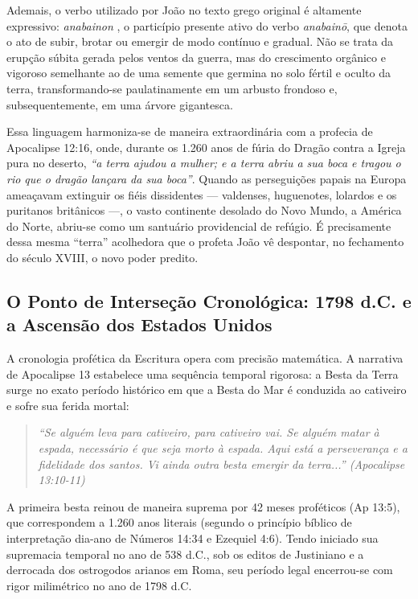 Ademais, o verbo utilizado por João no texto grego original é altamente expressivo: \textit{anabainon} , o particípio presente ativo do verbo \textit{anabainō}, que denota o ato de subir, brotar ou emergir de modo contínuo e gradual. Não se trata da erupção súbita gerada pelos ventos da guerra, mas do crescimento orgânico e vigoroso semelhante ao de uma semente que germina no solo fértil e oculto da terra, transformando-se paulatinamente em um arbusto frondoso e, subsequentemente, em uma árvore gigantesca.

Essa linguagem harmoniza-se de maneira extraordinária com a profecia de Apocalipse 12:16, onde, durante os 1.260 anos de fúria do Dragão contra a Igreja pura no deserto, \textit{``a terra ajudou a mulher; e a terra abriu a sua boca e tragou o rio que o dragão lançara da sua boca''}. Quando as perseguições papais na Europa ameaçavam extinguir os fiéis dissidentes — valdenses, huguenotes, lolardos e os puritanos britânicos —, o vasto continente desolado do Novo Mundo, a América do Norte, abriu-se como um santuário providencial de refúgio. É precisamente dessa mesma ``terra'' acolhedora que o profeta João vê despontar, no fechamento do século XVIII, o novo poder predito.



\subsection{O Ponto de Interseção Cronológica: 1798 d.C. e a Ascensão dos Estados Unidos}


A cronologia profética da Escritura opera com precisão matemática. A narrativa de Apocalipse 13 estabelece uma sequência temporal rigorosa: a Besta da Terra surge no exato período histórico em que a Besta do Mar é conduzida ao cativeiro e sofre sua ferida mortal:


\begin{quote}
\itshape \textit{``Se alguém leva para cativeiro, para cativeiro vai. Se alguém matar à espada, necessário é que seja morto à espada. Aqui está a perseverança e a fidelidade dos santos. Vi ainda outra besta emergir da terra...''} (Apocalipse 13:10-11)
\end{quote}


A primeira besta reinou de maneira suprema por 42 meses proféticos (Ap 13:5), que correspondem a 1.260 anos literais (segundo o princípio bíblico de interpretação dia-ano de Números 14:34 e Ezequiel 4:6). Tendo iniciado sua supremacia temporal no ano de 538 d.C., sob os editos de Justiniano e a derrocada dos ostrogodos arianos em Roma, seu período legal encerrou-se com rigor milimétrico no ano de 1798 d.C.


